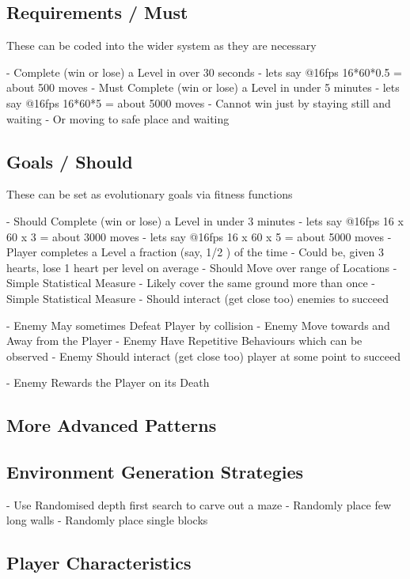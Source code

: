 \documentclass{article}
\begin{document}
\subsection{Requirements / Must}
 
These can be coded into the wider system as they are necessary

 - Complete (win or lose) a Level in over 30 seconds
     - lets say @16fps 16*60*0.5 = about 500 moves
 - Must Complete (win or lose) a Level in under 5 minutes
     - lets say @16fps 16*60*5 = about 5000 moves
 - Cannot win just by staying still and waiting
    - Or moving to safe place and waiting

\subsection{Goals / Should}

 These can be set as evolutionary goals via fitness functions

 - Should Complete (win or lose) a Level in under 3 minutes
     - lets say @16fps 16 x 60 x 3 = about 3000 moves
     - lets say @16fps 16 x 60 x 5 = about 5000 moves
 - Player completes a Level a fraction (say, 1/2 ) of the time
    - Could be, given 3 hearts, lose 1 heart per level on average
 - Should Move over range of Locations
    - Simple Statistical Measure
 - Likely cover the same ground more than once
    - Simple Statistical Measure
 - Should interact (get close too) enemies to succeed

 - Enemy May sometimes Defeat Player by collision
 - Enemy Move towards and Away from the Player
 - Enemy Have Repetitive Behaviours which can be observed
 - Enemy Should interact (get close too) player at some point to succeed

 - Enemy Rewards the Player on its Death

\subsection{More Advanced Patterns}

\subsection{Environment Generation Strategies}

 - Use Randomised depth first search to carve out a maze
 - Randomly place few long walls
 - Randomly place single blocks

\subsection{Player Characteristics}
\end{document}
